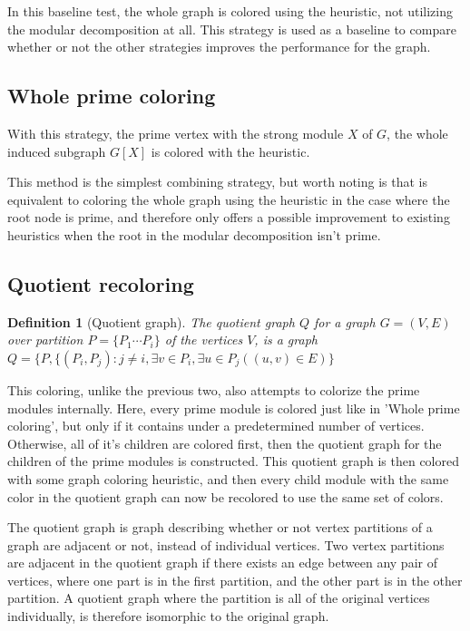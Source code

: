 \documentclass[a4paper]{article}
\newtheorem{definition}{Definition}[section]
\begin{document}
In this baseline test, the whole graph is colored using the heuristic, not
utilizing the modular decomposition at all. This strategy is used as a baseline
to compare whether or not the other strategies improves the performance for the
graph.

\subsection{Whole prime coloring}

With this strategy, the prime vertex with the strong module $X$ of $G$, the
whole induced subgraph $G[X]$ is colored with the heuristic.

This method is the simplest combining strategy, but worth noting is that is
equivalent to coloring the whole graph using the heuristic in the case where the
root node is prime, and therefore only offers a possible improvement to existing
heuristics when the root in the modular decomposition isn't prime.

\subsection{Quotient recoloring}

\begin{definition}[Quotient graph]
    The quotient graph $Q$ for a graph $G = (V,E)$ over partition 
    $P = \{P_1 \cdots P_i\}$  of the vertices $V$, is a graph 
    $Q = \{P, \{(P_i,P_j) : j\neq i, \exists v \in P_i,\exists u \in P_j( (u,v)
    \in E)   \}   $
\end{definition}

This coloring, unlike the previous two, also attempts to colorize the prime
modules internally. Here, every prime module is colored just like in 'Whole
prime coloring', but only if it contains under a predetermined number of
vertices. Otherwise, all of it's children are colored first, then the quotient
graph for the children of the prime modules is constructed. This quotient graph
is then colored with some graph coloring heuristic, and then every child module
with the same color in the quotient graph can now be recolored to use the same
set of colors.

The quotient graph is graph describing whether or not vertex partitions of a
graph are adjacent or not, instead of individual vertices. Two vertex
partitions are adjacent in the quotient graph if there exists an edge between
any pair of vertices, where one part is in the first partition, and the other
part is in the other partition. A quotient graph where the partition is all of
the original vertices individually, is therefore isomorphic to the original
graph.
\end{document}
